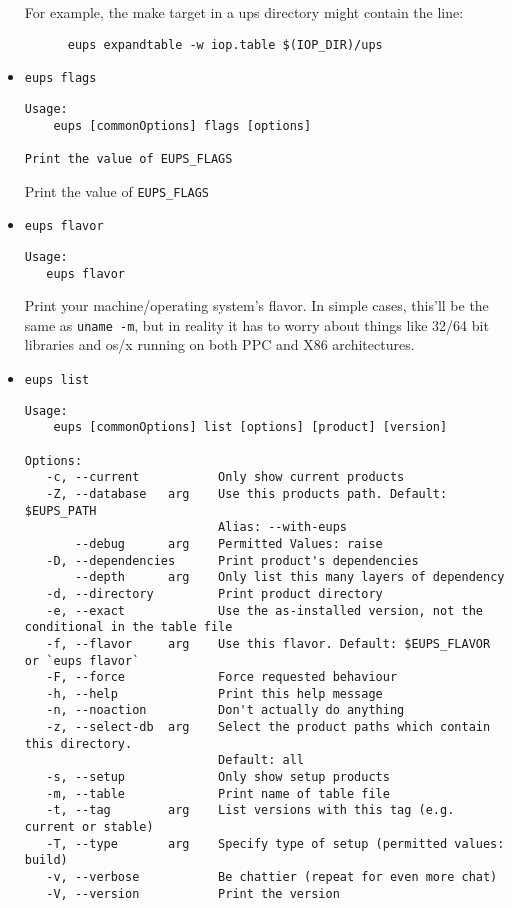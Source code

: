 \documentclass{article}
\newcommand{\code}[1]{\texttt{#1}}
\begin{document}
\begin{itemize}
For example, the make target in a ups directory might contain the line:
\begin{verbatim}
      eups expandtable -w iop.table $(IOP_DIR)/ups
\end{verbatim}				%


\item \code{eups flags}
\begin{verbatim}
Usage:
    eups [commonOptions] flags [options]

Print the value of EUPS_FLAGS
\end{verbatim}
  
Print the value of \code{EUPS\_FLAGS}


\item \code{eups flavor}
\begin{verbatim}
Usage:
   eups flavor
\end{verbatim}
  
Print your machine/operating system's flavor.  In simple cases, this'll
be the same as \code{uname -m}, but in reality it has to worry about things
like 32/64 bit libraries and os/x running on both PPC and X86 architectures.


\item \code{eups list}
\begin{verbatim}
Usage:
    eups [commonOptions] list [options] [product] [version]

Options:
   -c, --current           Only show current products
   -Z, --database   arg    Use this products path. Default: $EUPS_PATH
                           Alias: --with-eups
       --debug      arg    Permitted Values: raise
   -D, --dependencies      Print product's dependencies
       --depth      arg    Only list this many layers of dependency
   -d, --directory         Print product directory
   -e, --exact             Use the as-installed version, not the conditional in the table file
   -f, --flavor     arg    Use this flavor. Default: $EUPS_FLAVOR or `eups flavor`
   -F, --force             Force requested behaviour
   -h, --help              Print this help message
   -n, --noaction          Don't actually do anything
   -z, --select-db  arg    Select the product paths which contain this directory.
                           Default: all
   -s, --setup             Only show setup products
   -m, --table             Print name of table file
   -t, --tag        arg    List versions with this tag (e.g. current or stable)
   -T, --type       arg    Specify type of setup (permitted values: build)
   -v, --verbose           Be chattier (repeat for even more chat)
   -V, --version           Print the version
\end{verbatim}


\end{itemize}
\end{document}
